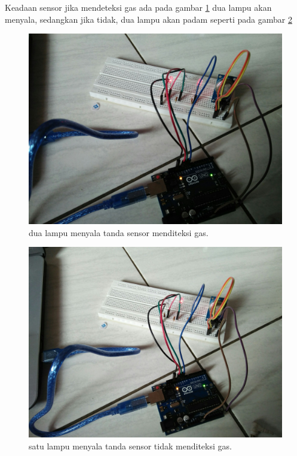 Keadaan sensor jika mendeteksi gas ada pada gambar \ref{terditeksi} dua lampu akan menyala, sedangkan jika tidak, dua lampu akan padam seperti pada gambar \ref{tidakterditeksi}

\begin{figure}[ht]
	\centerline{\includegraphics[width=1\textwidth]{figures/terditeksi.jpg}}
	\caption{dua lampu menyala tanda sensor menditeksi gas.}
	\label{terditeksi}
	\end{figure}
\begin{figure}[ht]
	\centerline{\includegraphics[width=1\textwidth]{figures/tidakterditeksi.jpg}}
	\caption{satu lampu menyala tanda sensor tidak menditeksi gas.}
	\label{tidakterditeksi}
	\end{figure}